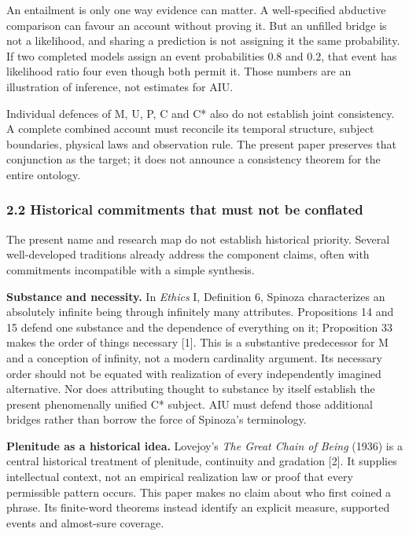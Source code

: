 \documentclass[
  10pt,
  a4paper,
]{article}
\begin{document}
An entailment is only one way evidence can matter. A well-specified
abductive comparison can favour an account without proving it. But an
unfilled bridge is not a likelihood, and sharing a prediction is not
assigning it the same probability. If two completed models assign an
event probabilities \(0.8\) and \(0.2\), that event has likelihood ratio
four even though both permit it. Those numbers are an illustration of
inference, not estimates for AIU.

Individual defences of M, U, P, C and C* also do not establish joint
consistency. A complete combined account must reconcile its temporal
structure, subject boundaries, physical laws and observation rule. The
present paper preserves that conjunction as the target; it does not
announce a consistency theorem for the entire ontology.

\subsubsection{2.2 Historical commitments that must not be
conflated}\label{historical-commitments-that-must-not-be-conflated}

The present name and research map do not establish historical priority.
Several well-developed traditions already address the component claims,
often with commitments incompatible with a simple synthesis.

\textbf{Substance and necessity.} In \emph{Ethics} I, Definition 6,
Spinoza characterizes an absolutely infinite being through infinitely
many attributes. Propositions 14 and 15 defend one substance and the
dependence of everything on it; Proposition 33 makes the order of things
necessary {[}1{]}. This is a substantive predecessor for M and a
conception of infinity, not a modern cardinality argument. Its necessary
order should not be equated with realization of every independently
imagined alternative. Nor does attributing thought to substance by
itself establish the present phenomenally unified C* subject. AIU must
defend those additional bridges rather than borrow the force of
Spinoza's terminology.

\textbf{Plenitude as a historical idea.} Lovejoy's \emph{The Great Chain
of Being} (1936) is a central historical treatment of plenitude,
continuity and gradation {[}2{]}. It supplies intellectual context, not
an empirical realization law or proof that every permissible pattern
occurs. This paper makes no claim about who first coined a phrase. Its
finite-word theorems instead identify an explicit measure, supported
events and almost-sure coverage.
\end{document}
